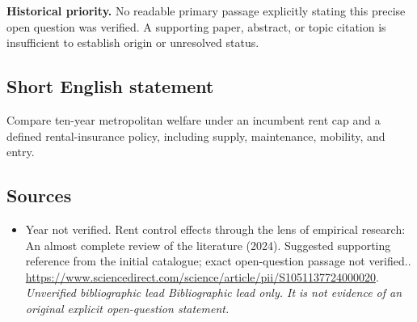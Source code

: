 \documentclass[11pt]{article}
\begin{document}
\par\textbf{Historical priority.} No readable primary passage explicitly stating this precise open question was verified. A supporting paper, abstract, or topic citation is insufficient to establish origin or unresolved status.

\subsection{Short English statement}
Compare ten-year metropolitan welfare under an incumbent rent cap and a defined rental-insurance policy, including supply, maintenance, mobility, and entry.

\subsection{Sources}
\begin{itemize}\raggedright
\item[\textnormal{[S1]}]\hypertarget{source:30007745:1}{} Year not verified. Rent control effects through the lens of empirical research: An almost complete review of the literature (2024). Suggested supporting reference from the initial catalogue; exact open-question passage not verified..
\url{https://www.sciencedirect.com/science/article/pii/S1051137724000020}.
{\small\textit{Unverified bibliographic lead Bibliographic lead only. It is not evidence of an original explicit open-question statement.}}
\end{itemize}
\end{document}
